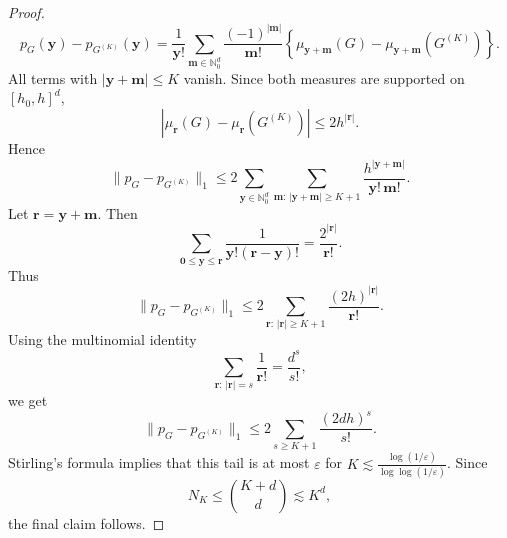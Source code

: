 \documentclass[twoside,12pt]{article}
\begin{document}
\begin{proof}
\begin{displaymath}
p_G(\boldsymbol y)-p_{G^{(K)}}(\boldsymbol y)=\frac{1}{\boldsymbol y!}\sum_{\boldsymbol m\in\mathbb N_0^d}\frac{(-1)^{|\boldsymbol m|}}{\boldsymbol m!}\left\{
\mu_{\boldsymbol y+\boldsymbol m}(G)-\mu_{\boldsymbol y+\boldsymbol m}(G^{(K)})\right\}.
\end{displaymath}
All terms with $|\boldsymbol y+\boldsymbol m|\le K$ vanish. Since both measures are supported
on $[h_{0},h]^d$,
\begin{displaymath}
\left|\mu_{\boldsymbol r}(G)-\mu_{\boldsymbol r}(G^{(K)})\right|\le2h^{|\boldsymbol r|}.
\end{displaymath}
Hence
\begin{displaymath}
\|p_G-p_{G^{(K)}}\|_1\le2\sum_{\boldsymbol y\in\mathbb N_0^d}\sum_{\boldsymbol m:\,|\boldsymbol y+\boldsymbol m|\ge K+1}\frac{h^{|\boldsymbol y+\boldsymbol m|}}
{\boldsymbol y!\,\boldsymbol m!}.
\end{displaymath}
Let $\boldsymbol r=\boldsymbol y+\boldsymbol m$. Then
\begin{displaymath}
\sum_{\boldsymbol 0\le \boldsymbol y\le\boldsymbol r}\frac{1}{\boldsymbol y!(\boldsymbol r-\boldsymbol y)!}=\frac{2^{|\boldsymbol r|}}{\boldsymbol r!}.
\end{displaymath}
Thus
\begin{displaymath}
\|p_G-p_{G^{(K)}}\|_1\le2\sum_{\boldsymbol r:\,|\boldsymbol r|\ge K+1}\frac{(2h)^{|\boldsymbol r|}}{\boldsymbol r!}.
\end{displaymath}
Using the multinomial identity
\begin{displaymath}
\sum_{\boldsymbol r:\,|\boldsymbol r|=s}\frac{1}{\boldsymbol r!}=\frac{d^s}{s!},
\end{displaymath}
we get
\begin{displaymath}
\|p_G-p_{G^{(K)}}\|_1\le2\sum_{s\geq K+1}\frac{(2dh)^s}{s!}.
\end{displaymath}
Stirling's formula implies that this tail is at most $\varepsilon$ for $K\lesssim\frac{\log(1/\varepsilon)}{\log\log(1/\varepsilon)}$. Since
\begin{displaymath}
N_K\le \binom{K+d}{d}\lesssim K^d,
\end{displaymath}
the final claim follows.
\end{proof}
\end{document}
